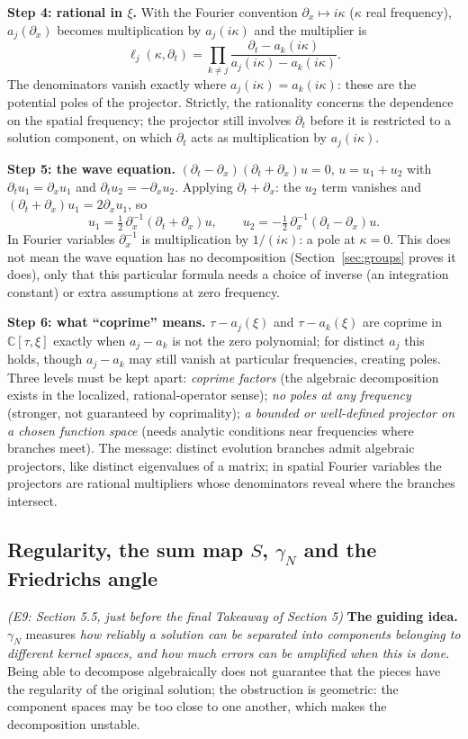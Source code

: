 \documentclass[11pt]{article}
\theoremstyle{plain}
\theoremstyle{definition}
\theoremstyle{remark}
\newcommand{\C}{\mathbb{C}}
\begin{document}
\medskip\textbf{Step 4: rational in $\xi$.} With the Fourier convention $\partial_x\mapsto i\kappa$ ($\kappa$ real frequency), $a_j(\partial_x)$ becomes multiplication by $a_j(i\kappa)$ and the multiplier is
\[
\ell_j(\kappa,\partial_t)=\prod_{k\ne j}\frac{\partial_t-a_k(i\kappa)}{a_j(i\kappa)-a_k(i\kappa)} .
\]
The denominators vanish exactly where $a_j(i\kappa)=a_k(i\kappa)$: these are the potential poles of the projector. Strictly, the rationality concerns the dependence on the spatial frequency; the projector still involves $\partial_t$ before it is restricted to a solution component, on which $\partial_t$ acts as multiplication by $a_j(i\kappa)$.

\medskip\textbf{Step 5: the wave equation.} $(\partial_t-\partial_x)(\partial_t+\partial_x)u=0$, $u=u_1+u_2$ with $\partial_tu_1=\partial_xu_1$ and $\partial_tu_2=-\partial_xu_2$. Applying $\partial_t+\partial_x$: the $u_2$ term vanishes and $(\partial_t+\partial_x)u_1=2\partial_xu_1$, so
\[
u_1=\tfrac12\,\partial_x^{-1}(\partial_t+\partial_x)u,\qquad u_2=-\tfrac12\,\partial_x^{-1}(\partial_t-\partial_x)u .
\]
In Fourier variables $\partial_x^{-1}$ is multiplication by $1/(i\kappa)$: a pole at $\kappa=0$. This does not mean the wave equation has no decomposition (Section~\ref{sec:groups} proves it does), only that this particular formula needs a choice of inverse (an integration constant) or extra assumptions at zero frequency.

\medskip\textbf{Step 6: what ``coprime'' means.} $\tau-a_j(\xi)$ and $\tau-a_k(\xi)$ are coprime in $\C[\tau,\xi]$ exactly when $a_j-a_k$ is not the zero polynomial; for distinct $a_j$ this holds, though $a_j-a_k$ may still vanish at particular frequencies, creating poles. Three levels must be kept apart: \emph{coprime factors} (the algebraic decomposition exists in the localized, rational-operator sense); \emph{no poles at any frequency} (stronger, not guaranteed by coprimality); \emph{a bounded or well-defined projector on a chosen function space} (needs analytic conditions near frequencies where branches meet). The message: distinct evolution branches admit algebraic projectors, like distinct eigenvalues of a matrix; in spatial Fourier variables the projectors are rational multipliers whose denominators reveal where the branches intersect.

\subsection{Regularity, the sum map $S$, $\gamma_N$ and the Friedrichs angle}\label{expl:E9}
\noindent\emph{(E9: Section 5.5, just before the final Takeaway of Section 5)}
\textbf{The guiding idea.} $\gamma_N$ measures \emph{how reliably a solution can be separated into components belonging to different kernel spaces, and how much errors can be amplified when this is done}. Being able to decompose algebraically does not guarantee that the pieces have the regularity of the original solution; the obstruction is geometric: the component spaces may be too close to one another, which makes the decomposition unstable.
\end{document}

